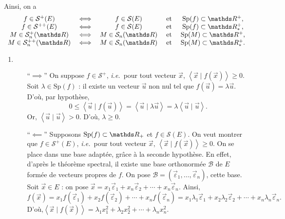 Ainsi, on a \[
	\begin{array}{ccccc}
		f \in \mathcal{S}^+(E)&\iff&f \in \mathcal{S}(E)&\text{ et }& \Sp(f) \subset \R^+,\\
		f \in \mathcal{S}^{++}(E)&\iff&f \in \mathcal{S}(E)&\text{ et }& \Sp(f) \subset \R^+_*,\\
		M \in \mathcal{S}_n^+(\R)&\iff&M \in \mathcal{S}_n(\R)&\text{ et }& \Sp(M) \subset \R^+,\\
		M \in \mathcal{S}_n^{++}(\R)&\iff&M \in \mathcal{S}_n(\R)&\text{ et }& \Sp(M) \subset \R^+_*.\\
	\end{array}
\]


\begin{prv}
	\begin{enumerate}
		\item
			\begin{itemize}
				\item[``$\implies$'']
					On suppose $f \in \mathcal{S}^+$, \textit{i.e.}\ pour tout vecteur $\vec{x}$, $\left<\vec{x}  \mid f(\vec{x}) \right> \ge  0$.
					Soit $\lambda \in \mathrm{Sp}(f)$ : il existe un vecteur $\vec{u}$\/ non nul tel que $f(\vec{u}) = \lambda \vec{u}$.
					D'où, par hypothèse, \[
						0 \le \left< \vec{u}  \mid f(\vec{u}) \right> = \left<\vec{u}  \mid \lambda \vec{u} \right> = \lambda \left<\vec{u} \mid \vec{u} \right>
					.\]
					Or, $\left<\vec{u}  \mid \vec{u} \right> > 0$.
					D'où, $\lambda \ge 0$.
				\item[``$\impliedby$'']
					Supposons $\Sp(f) \subset \R_+$\/ et $f \in \mathcal{S}(E)$.
					On veut montrer que $f \in \mathcal{S}^+(E)$, \textit{i.e.}\ pour tout vecteur $\vec{x}$, $\left<\vec{x}  \mid f(\vec{x}) \right> \ge 0$.
					On se place dans une base adaptée, grâce à la seconde hypothèse.
					En effet, d'après le théorème spectral, il existe une base orthonormée $\mathcal{B}$\/ de $E$\/ formée de vecteurs propres de $f$.
					On pose $\mathcal{B} = (\vec{\varepsilon}_1, \ldots, \vec{\varepsilon}_n)$, cette base.
					Soit $\vec{x} \in E$ : on pose $\vec{x} = x_1 \vec{\varepsilon}_1 + x_n \vec{\varepsilon}_2 + \cdots + x_n \vec{\varepsilon}_n$.
					Ainsi, \[
						f(\vec{x}) = x_1 f(\vec{\varepsilon}_1) + x_2 f(\vec{\varepsilon}_2) + \cdots + x_n f(\vec{\varepsilon}_n)
						= x_1 \lambda_1 \vec{\varepsilon}_1 + x_2 \lambda_2 \vec{\varepsilon}_2 + \cdots + x_n \lambda_n \vec{\varepsilon}_n
					.\]
					D'où,$\left<\vec{x}  \mid f(\vec{x}) \right> = \lambda_1x_1^2 + \lambda_2 x_2^2 + \cdots + \lambda_n x_n^2$.

\end{itemize}
\end{enumerate}
\end{prv}
